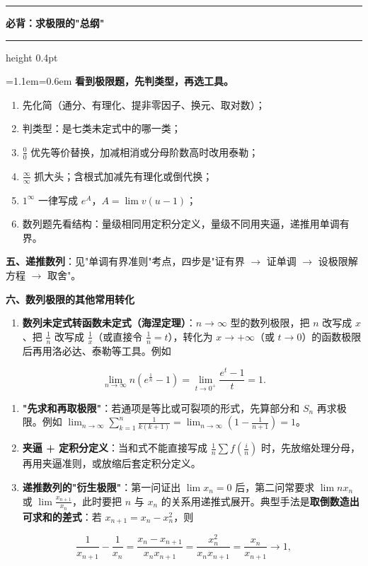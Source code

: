 \documentclass[11pt,openany,UTF8]{ctexbook}
\newcommand{\callouthead}[2]{%
  \par\addvspace{7pt}\noindent
  {\color{#1}\rule[-0.15em]{3pt}{1.05em}}\hspace{0.5em}%
  {\bfseries\color{#1}#2}\par\nobreak\vspace{-0.35em}%
  {\color{rulesep}\hrule height 0.4pt}\nobreak\vspace{0.45em}%
  \begingroup\small\setlength{\parindent}{0pt}%
  \leftskip=1.1em\rightskip=0.6em\noindent\ignorespaces}
\newcommand{\calloutend}{\par\endgroup\addvspace{7pt}}
\newenvironment{callkey}[1]{\callouthead{keybar}{#1}}{\calloutend}
\begin{document}
\begin{callkey}{必背：求极限的"总纲"}
\textbf{看到极限题，先判类型，再选工具。}

\begin{enumerate}
\item 先化简（通分、有理化、提非零因子、换元、取对数）；
\item 判类型：是七类未定式中的哪一类；
\item $\frac00$ 优先等价替换，加减相消或分母阶数高时改用泰勒；
\item $\frac{\infty}{\infty}$ 抓大头；含根式加减先有理化或倒代换；
\item $1^{\infty}$ 一律写成 $e^{A}$，$A=\lim v(u-1)$；
\item 数列题先看结构：量级相同用定积分定义，量级不同用夹逼，递推用单调有界。
\end{enumerate}
\end{callkey}

\textbf{五、递推数列}：见"单调有界准则"考点，四步是"证有界 $\to$ 证单调 $\to$ 设极限解方程 $\to$ 取舍"。

\textbf{六、数列极限的其他常用转化}

\begin{enumerate}
\item \textbf{数列未定式转函数未定式（海涅定理）}：$n\to\infty$ 型的数列极限，把 $n$ 改写成 $x$、把 $\frac1n$ 改写成 $\frac1x$（或直接令 $\frac1n=t$），转化为 $x\to+\infty$（或 $t\to 0$）的函数极限后再用洛必达、泰勒等工具。例如
\end{enumerate}
\[\lim_{n\to\infty}n\left(e^{\frac1n}-1\right)=\lim_{t\to 0^+}\frac{e^{t}-1}{t}=1 .\]

\begin{enumerate}
\item \textbf{"先求和再取极限"}：若通项是等比或可裂项的形式，先算部分和 $S_n$ 再求极限。例如 $\lim_{n\to\infty}\sum_{k=1}^{n}\frac{1}{k(k+1)}=\lim_{n\to\infty}\left(1-\frac{1}{n+1}\right)=1$。
\item \textbf{夹逼 + 定积分定义}：当和式不能直接写成 $\frac1n\sum f\left(\frac in\right)$ 时，先放缩处理分母，再用夹逼准则，或放缩后套定积分定义。
\item \textbf{递推数列的"衍生极限"}：第一问证出 $\lim x_n=0$ 后，第二问常要求 $\lim nx_n$ 或 $\lim\frac{x_{n+1}}{x_n}$，此时要把 $n$ 与 $x_n$ 的关系用递推式展开。典型手法是\textbf{取倒数造出可求和的差式}：若 $x_{n+1}=x_n-x_n^{2}$，则
\end{enumerate}
\[\frac{1}{x_{n+1}}-\frac{1}{x_n}=\frac{x_n-x_{n+1}}{x_nx_{n+1}}=\frac{x_n^{2}}{x_nx_{n+1}}=\frac{x_n}{x_{n+1}}\to 1,\]
\end{document}
